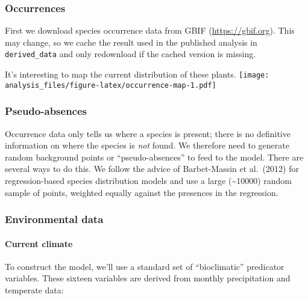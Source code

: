 \documentclass[]{article}
\let\oldparagraph\paragraph
\renewcommand{\paragraph}[1]{\oldparagraph{#1}\mbox{}}
\begin{document}
\hypertarget{occurrences}{%
\subsubsection{Occurrences}\label{occurrences}}

First we download species occurrence data from GBIF
(\url{https://gbif.org}). This may change, so we cache the result used
in the published analysis in \texttt{derived\_data} and only redownload
if the cached version is missing.

It's interesting to map the current distribution of these plants.
\texttt{[image: analysis\_files/figure-latex/occurrence-map-1.pdf]}

\hypertarget{pseudo-absences}{%
\subsubsection{Pseudo-absences}\label{pseudo-absences}}

Occurrence data only tells us where a species is present; there is no
definitive information on where the species is \emph{not} found. We
therefore need to generate random background points or
``pseudo-absences'' to feed to the model. There are several ways to do
this. We follow the advice of Barbet-Massin et al.~(2012) for
regression-based species distribution models and use a large
(\textasciitilde10000) random sample of points, weighted equally against
the presences in the regression.

\hypertarget{environmental-data}{%
\subsubsection{Environmental data}\label{environmental-data}}

\hypertarget{current-climate}{%
\paragraph{Current climate}\label{current-climate}}

To construct the model, we'll use a standard set of ``bioclimatic''
predicator variables. These sixteen variables are derived from monthly
precipitation and temperate data:
\end{document}
